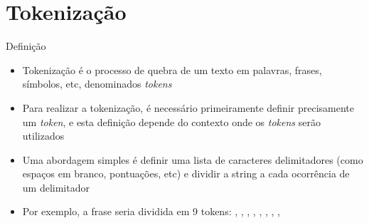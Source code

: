 \section{Tokenização}

\begin{frame}[fragile]{Definição}

    \begin{itemize}
        \item Tokenização é o processo de quebra de um texto em palavras, frases, símbolos, etc, 
            denominados \textit{tokens}
        \pause

        \item Para realizar a tokenização, é necessário primeiramente definir precisamente um 
            \textit{token}, e esta definição depende do contexto onde os \textit{tokens} serão 
            utilizados
        \pause

        \item Uma abordagem simples é definir uma lista de caracteres delimitadores (como espaços 
            em branco, pontuações, etc) e dividir a string a cada ocorrência de um delimitador
        \pause

        \item Por exemplo, a frase  seria dividida 
            em 9 tokens: , , , , 
            , , , , 
    \end{itemize}

\end{frame}

